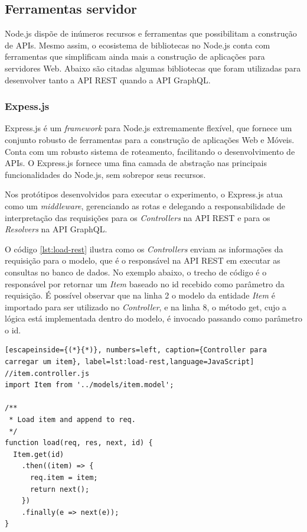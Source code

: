 \subsection{Ferramentas servidor}

Node.js dispõe de inúmeros recursos e ferramentas que possibilitam a construção de APIs. Mesmo assim, o ecosistema de bibliotecas no Node.js conta com ferramentas que simplificam ainda mais a construção de aplicações para servidores Web. Abaixo são citadas algumas bibliotecas que foram utilizadas para desenvolver tanto a API REST quando a API GraphQL. 

\subsubsection*{Expess.js}

Express.js é um \textit{framework} para Node.js extremamente flexível, que fornece um conjunto robusto de ferramentas para a construção de aplicações Web e Móveis. Conta com um robusto sistema de roteamento, facilitando o desenvolvimento de APIs. O Express.js fornece uma fina camada de abstração nas principais funcionalidades do Node.js, sem sobrepor seus recursos.

Nos protótipos desenvolvidos para executar o experimento, o Express.js atua como um \textit{middleware}, gerenciando as rotas e delegando a responsabilidade de interpretação das requisições para os \textit{Controllers} na API REST e para os \textit{Resolvers} na API GraphQL.

O código \ref{lst:load-rest} ilustra como os \textit{Controllers} enviam as informações da requisição para o modelo, que é o responsável na API REST em executar as consultas no banco de dados. No exemplo abaixo, o trecho de código é o responsável por retornar um \textit{Item} baseado no \textup{id} recebido como parâmetro da requisição. É possível observar que na linha 2 o modelo da entidade \textit{Item} é importado para ser utilizado no \textit{Controller}, e na linha 8, o método \textup{get}, cujo a lógica está implementada dentro do modelo, é invocado passando como parâmetro o \textup{id}.

\begin{lstlisting}[escapeinside={(*}{*)}, numbers=left, caption={Controller para carregar um item}, label=lst:load-rest,language=JavaScript]
//item.controller.js
import Item from '../models/item.model';

/**
 * Load item and append to req.
 */
function load(req, res, next, id) {
  Item.get(id)
    .then((item) => {
      req.item = item;
      return next();
    })
    .finally(e => next(e));
}

\end{lstlisting}

